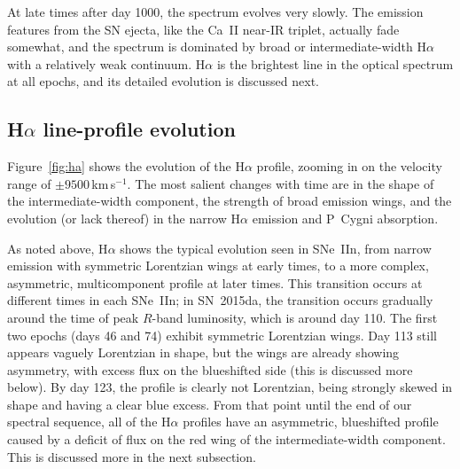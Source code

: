 \documentclass[fleqn,usenatbib,useAMS]{mnras}
\begin{document}
At late times after day 1000, the spectrum evolves very slowly.  The
emission features from the SN ejecta, like the Ca~II near-IR triplet, actually
fade somewhat, and the spectrum is dominated by broad or
intermediate-width H$\alpha$ with a relatively weak continuum.
H$\alpha$ is the brightest line in the optical spectrum at all epochs,
and its detailed evolution is discussed next.



\subsection{H$\alpha$ line-profile evolution}

Figure~\ref{fig:ha} shows the evolution of the H$\alpha$ profile,
zooming in on the velocity range of $\pm 9500$\,km\,s$^{-1}$.  The most
salient changes with time are in the shape of the intermediate-width
component, the strength of broad emission wings, and the evolution (or
lack thereof) in the narrow H$\alpha$ emission and P~Cygni absorption.

As noted above, H$\alpha$ shows the typical evolution seen
in SNe~IIn, from narrow emission with symmetric Lorentzian wings at early
times, to a more complex, asymmetric, multicomponent profile at later
times.  This transition occurs at different times in each
SNe~IIn; in SN~2015da, the transition occurs gradually around the
time of peak $R$-band luminosity, which is around day 110.  The first
two epochs (days 46 and 74) exhibit symmetric Lorentzian wings.  Day
113 still appears vaguely Lorentzian in shape, but the wings are
already showing asymmetry, with excess flux on the blueshifted side
(this is discussed more below).  By day 123, the profile is clearly
not Lorentzian, being strongly skewed in shape and having a clear blue
excess.  From that
point until the end of our spectral sequence, all of the H$\alpha$
profiles have an asymmetric, blueshifted profile caused by a deficit
of flux on the red wing of the intermediate-width component. This is
discussed more in the next subsection.
\end{document}
